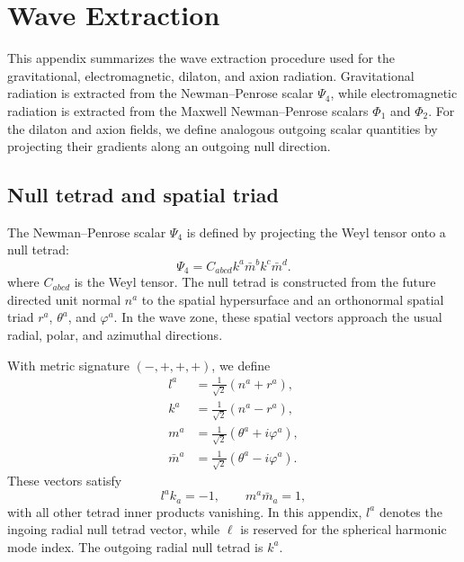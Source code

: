 \section{Wave Extraction}
\label{sec:app waveex}

This appendix summarizes the wave extraction procedure used for the gravitational, electromagnetic, dilaton, and axion radiation. Gravitational radiation is extracted from the Newman--Penrose scalar $\Psi_4$, while electromagnetic radiation is extracted from the Maxwell Newman--Penrose scalars $\Phi_1$ and $\Phi_2$. For the dilaton and axion fields, we define analogous outgoing scalar quantities by projecting their gradients along an outgoing null direction.

\subsection{Null tetrad and spatial triad}

The Newman--Penrose scalar $\Psi_4$ is defined by projecting the Weyl tensor onto a null tetrad:
\begin{equation}
    \Psi_4
    =
    C_{abcd} k^a \bar{m}^b k^c \bar{m}^d .
    \label{eq:app waveex psi4-def}
\end{equation}
where $C_{abcd}$ is the Weyl tensor. The null tetrad is constructed from the future directed unit normal $n^a$ to the spatial hypersurface and an orthonormal spatial triad $r^a$, $\theta^a$, and $\varphi^a$. In the wave zone, these spatial vectors approach the usual radial, polar, and azimuthal directions.

With metric signature $(-,+,+,+)$, we define
\begin{equation}
\begin{aligned}
    l^a
    &=
    \frac{1}{\sqrt{2}}\left(n^a+r^a\right),
    \\
    k^a
    &=
    \frac{1}{\sqrt{2}}\left(n^a-r^a\right),
    \\
    m^a
    &=
    \frac{1}{\sqrt{2}}\left(\theta^a+i\varphi^a\right),
    \\
    \bar{m}^a
    &=
    \frac{1}{\sqrt{2}}\left(\theta^a-i\varphi^a\right).
\end{aligned}
\label{eq:app waveex null tetrad}
\end{equation}
These vectors satisfy
\begin{equation}
    l^a k_a = -1,
    \qquad
    m^a \bar{m}_a = 1,
\end{equation}
with all other tetrad inner products vanishing. In this appendix, $l^a$ denotes the ingoing radial null tetrad vector, while $\ell$ is reserved for the spherical harmonic mode index.  The outgoing radial null tetrad is $k^a$.   

